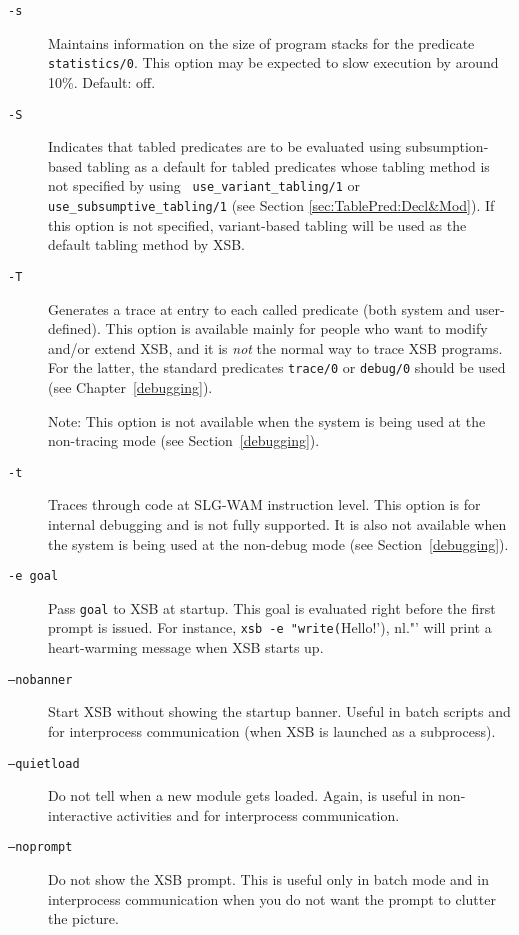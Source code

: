 \begin{description}
%
\item[{\tt -s}] Maintains information on the size of program stacks 
    for the predicate {\tt statistics/0}.  This option may be expected
    to slow execution by around 10\%.  Default: off.
\item[{\tt -S}] Indicates that tabled predicates are to be evaluated
    using subsumption-based tabling as a default for tabled predicates
    whose tabling method is not specified by using {\tt
    use\_variant\_tabling/1} or {\tt use\_subsumptive\_tabling/1} (see
    Section \ref{sec:TablePred:Decl&Mod}).  If this option is not
    specified, variant-based tabling will be used as the default tabling
    method by XSB\@.
\item[{\tt -T}] Generates a trace at entry to each called predicate
    (both system and user-defined).  This option is available mainly
    for people who want to modify and/or extend XSB, and it is
    {\em not\/} the normal way to trace XSB programs.  For the
    latter, the standard predicates {\tt trace/0} or {\tt debug/0}
    should be used (see Chapter~\ref{debugging}).

    Note: This option is not available when the system is being used
    at the non-tracing mode (see Section~\ref{debugging}).
\item[{\tt -t}] Traces through code at SLG-WAM instruction level.  This
    option is for internal debugging and is not fully supported.
    It is also not available when the system is being used at the non-debug
    mode (see Section~\ref{debugging}).
\item[{\tt -e goal}] Pass {\tt goal}  to XSB at startup. This goal is evaluated
    right before the first prompt is issued. For instance, 
    \verb'xsb -e "write('Hello!'), nl."'
    will print a heart-warming message when XSB starts up.
  \item[{\tt --nobanner}] Start XSB without showing the startup banner.
    Useful in batch scripts and for interprocess communication (when XSB is
    launched as a subprocess).
  \item[{\tt --quietload}] Do not tell when a new module gets loaded. Again, is
    useful in non-interactive activities and for interprocess communication.
  \item[{\tt --noprompt}] Do not show the XSB prompt. This is useful only in batch
    mode and in interprocess communication when you do not want the prompt
    to clutter the picture.
\end{description}

